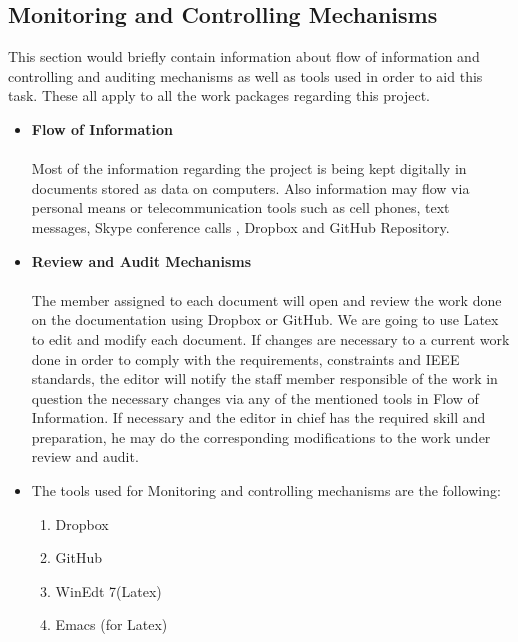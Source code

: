 \documentclass[12pt]{article}
\begin{document}
\subsection{Monitoring and Controlling Mechanisms}
This section would briefly contain information about flow of information and controlling and auditing mechanisms as well as tools used in order to aid this task. These all apply to all the work packages regarding this project.
\begin{itemize}
  \item \textbf{Flow of Information}\\\\
  Most of the information regarding the project is being kept digitally in documents stored as data on computers. Also information may flow via personal means or telecommunication tools such as cell phones, text messages, Skype conference calls , Dropbox  and GitHub Repository.
  \item \textbf{Review and Audit Mechanisms}\\\\
  The member assigned to each document will open and review the work done on the documentation using Dropbox or GitHub. We are going to use Latex to edit and modify each document. If changes are necessary to a current work done in order to comply with the requirements, constraints and IEEE standards, the editor will notify the staff member responsible of the work in question the necessary changes via any of the mentioned tools in Flow of Information. If necessary and the editor in chief has the required skill and preparation, he may do the corresponding modifications to the work under review and audit.
  \item The tools used for Monitoring and controlling mechanisms are the following:
      \begin{enumerate}
        \item Dropbox
        \item GitHub
        \item WinEdt 7(Latex)
        \item Emacs (for Latex)
      \end{enumerate}
\end{itemize}
\end{document}

